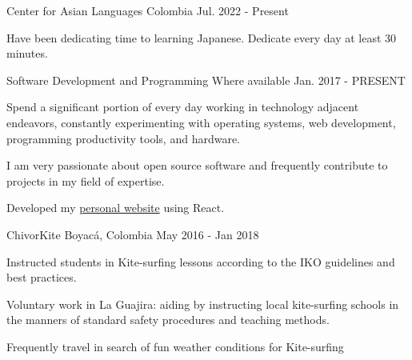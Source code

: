 

\begin{cventries}

	{Center for Asian Languages} %
	{Colombia} %
	{Jul. 2022 {-} Present} %
	{
		\begin{cvitems} %
			\item {Have been dedicating time to learning Japanese. Dedicate every day at least 30 minutes.}
		\end{cvitems}
	}

	{Software Development and Programming} %
	{Where available} %
	{Jan. 2017 {-} PRESENT} %
	{
		\begin{cvitems} %
			\item {Spend a significant portion of every day working in technology adjacent endeavors, constantly experimenting with operating systems, web development, programming productivity tools, and hardware.}
			\item {I am very passionate about open source software and frequently contribute to projects in my field of expertise.}
			\item {Developed my \href{https://mantimantilla.github.io/}{personal website} using React.}
		\end{cvitems}
	}

	{ChivorKite} %
	{Boyacá, Colombia} %
	{May 2016 {-} Jan 2018 } %
	{
		\begin{cvitems} %
			\item {Instructed students in Kite-surfing lessons according to the IKO guidelines and best practices.}
			\item {Voluntary work in La Guajira: aiding by instructing local kite-surfing schools in the manners
			            of standard safety procedures and teaching methods.}
			\item {Frequently travel in search of fun weather conditions for Kite-surfing}
		\end{cvitems}
	}


\end{cventries}
